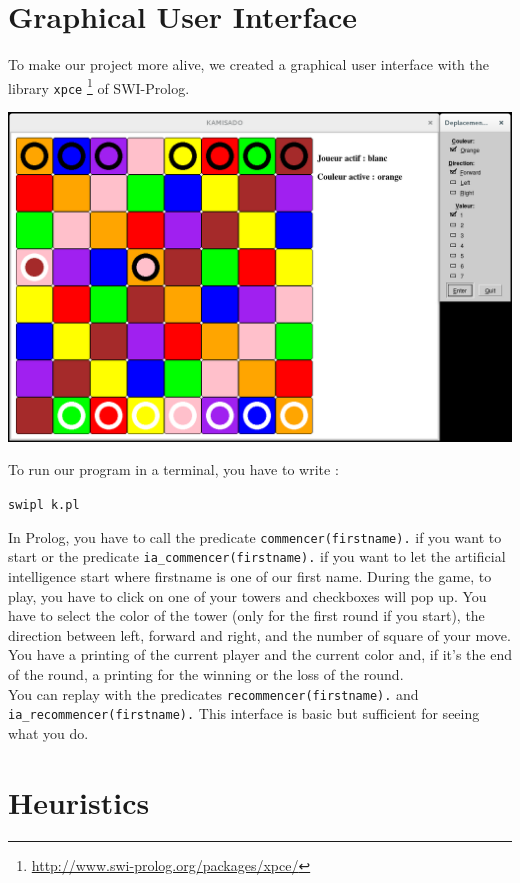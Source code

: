 \documentclass[a4paper, 11pt]{article}
\begin{document}
\section{Graphical User Interface}
To make our project more alive, we created a graphical user interface with the library \verb?xpce? \footnote{\url{http://www.swi-prolog.org/packages/xpce/}} of SWI-Prolog.\\
\begin{center}
\includegraphics[scale = 0.30]{kamisado.png}
\end{center}
To run our program in a terminal, you have to write :
\begin{center}
\verb?swipl k.pl?
\end{center}
In Prolog, you have to call the predicate \verb?commencer(firstname).? if you want to start or the predicate \verb?ia_commencer(firstname).? if you want to let the artificial intelligence start where firstname is one of our first name. 
During the game, to play, you have to click on one of your towers and checkboxes will pop up. You have to select the color of the tower (only for the first round if you start), the direction  between left, forward and right, and the number of square of your move.
You have a printing of the current player and the current color and, if it's the end of the round, a printing for the winning or the loss of the round.\\
You can replay with the predicates \verb?recommencer(firstname).? and \verb?ia_recommencer(firstname).?
This interface is basic but sufficient for seeing what you do.

\section{Heuristics}
\end{document}
